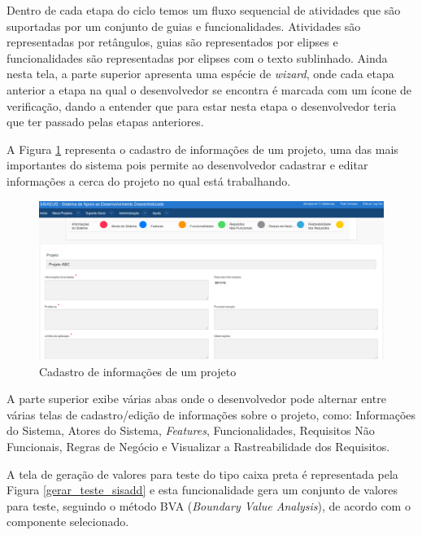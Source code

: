 Dentro de cada etapa do ciclo temos um fluxo sequencial de atividades que são suportadas por um conjunto de guias e funcionalidades. Atividades são representadas por retângulos, guias são representados por elipses e funcionalidades são representadas por elipses com o texto sublinhado. Ainda nesta tela, a parte superior apresenta uma espécie de \textit{wizard}, onde cada etapa anterior a etapa na qual o desenvolvedor se encontra é marcada com um ícone de verificação, dando a entender que para estar nesta etapa o desenvolvedor teria que ter passado pelas etapas anteriores. %

A Figura \ref{cadastro_projeto_sisadd} representa o cadastro de informações de um projeto, uma das mais importantes do sistema pois permite ao desenvolvedor cadastrar e editar informações a cerca do projeto no qual está trabalhando. \clearpage

\begin{figure}[!htb]
	\hspace*{-1.5cm} 
		\includegraphics[scale=0.40]{figuras/cadastro_projeto_p14}
	\caption{Cadastro de informações de um projeto}
	\label{cadastro_projeto_sisadd}
\end{figure}

A parte superior exibe várias abas onde o desenvolvedor pode alternar entre várias telas de cadastro/edição de informações sobre o projeto, como: Informações do Sistema, Atores do Sistema, \textit{Features}, Funcionalidades, Requisitos Não Funcionais, Regras de Negócio e Visualizar a Rastreabilidade dos Requisitos.

A tela de geração de valores para teste do tipo caixa preta é representada pela Figura \ref{gerar_teste_sisadd} e esta funcionalidade gera um conjunto de valores para teste, seguindo o método BVA (\textit{Boundary Value Analysis}), de acordo com o componente selecionado.\clearpage

